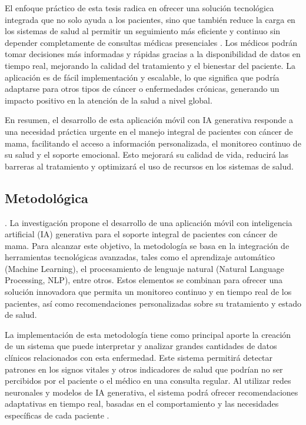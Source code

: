 El enfoque práctico de esta tesis radica en ofrecer una solución tecnológica integrada que no solo ayuda a los pacientes, sino que también reduce la carga en los sistemas de salud al permitir un seguimiento más eficiente y continuo sin depender completamente de consultas médicas presenciales \parencite{pascucci2021}. Los médicos podrán tomar decisiones más informadas y rápidas gracias a la disponibilidad de datos en tiempo real, mejorando la calidad del tratamiento y el bienestar del paciente. La aplicación es de fácil implementación y escalable, lo que significa que podría adaptarse para otros tipos de cáncer o enfermedades crónicas, generando un impacto positivo en la atención de la salud a nivel global.

En resumen, el desarrollo de esta aplicación móvil con IA generativa responde a una necesidad práctica urgente en el manejo integral de pacientes con cáncer de mama, facilitando el acceso a información personalizada, el monitoreo continuo de su salud y el soporte emocional. Esto mejorará su calidad de vida, reducirá las barreras al tratamiento y optimizará el uso de recursos en los sistemas de salud.

\subsection{Metodológica}. 
La investigación propone el desarrollo de una aplicación móvil con inteligencia artificial (IA) generativa para el soporte integral de pacientes con cáncer de mama. Para alcanzar este objetivo, la metodología se basa en la integración de herramientas tecnológicas avanzadas, tales como el aprendizaje automático (Machine Learning), el procesamiento de lenguaje natural (Natural Language Processing, NLP), entre otros. Estos elementos se combinan para ofrecer una solución innovadora que permita un monitoreo continuo y en tiempo real de los pacientes, así como recomendaciones personalizadas sobre su tratamiento y estado de salud.

La implementación de esta metodología tiene como principal aporte la creación de un sistema que puede interpretar y analizar grandes cantidades de datos clínicos relacionados con esta enfermedad. Este sistema permitirá detectar patrones en los signos vitales y otros indicadores de salud que podrían no ser percibidos por el paciente o el médico en una consulta regular. Al utilizar redes neuronales y modelos de IA generativa, el sistema podrá ofrecer recomendaciones adaptativas en tiempo real, basadas en el comportamiento y las necesidades específicas de cada paciente \parencite{ce2024}.

